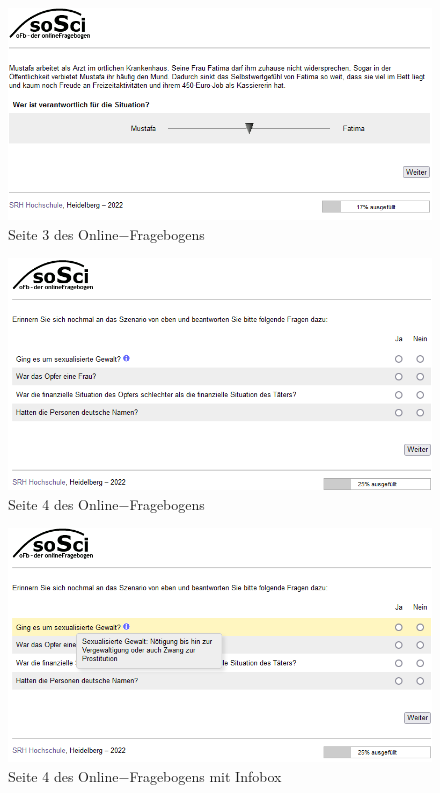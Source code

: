 \begin{appendices}
    \begin{figure}[htb!]
        \centering
            \includegraphics[width=\textwidth, frame]{Seite 3.png}
            \caption[]{Seite 3 des Online$-$Fragebogens}
    \end{figure}
    
    \newpage
    \begin{figure}[htb!]
        \centering
            \includegraphics[width=\textwidth, frame]{Seite 4.png}
            \caption[]{Seite 4 des Online$-$Fragebogens}
    \end{figure}
    
    \begin{figure}[htb!]
        \centering
            \includegraphics[width=\textwidth, frame]{Seite 4 mit Infobox.png}
            \caption[]{Seite 4 des Online$-$Fragebogens mit Infobox}
    \end{figure}
    

\end{appendices}
